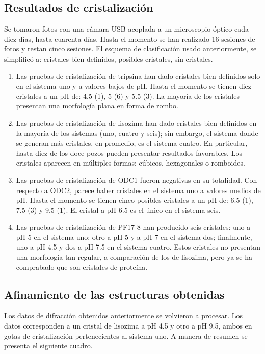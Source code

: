 \documentclass[11pt,letterpaper]{article}
\begin{document}
\subsection{Resultados de cristalización}
Se tomaron fotos con una cámara USB acoplada a un microscopio óptico cada diez días, hasta cuarenta días. Hasta el momento se han realizado 16 sesiones de fotos y restan cinco sesiones. El esquema de clasificación usado anteriormente, se simplificó a: cristales bien definidos, posibles cristales, sin cristales.
\begin{enumerate}
	\item Las pruebas de cristalización de tripsina han dado cristales bien definidos solo en el sistema uno y a valores bajos de pH. Hasta el momento se tienen diez cristales a un pH de: 4.5 (1), 5 (6) y 5.5 (3). La mayoría de los cristales presentan una morfología plana en forma de rombo.
	\item Las pruebas de cristalización de lisozima han dado cristales bien definidos en la mayoría de los sistemas (uno, cuatro y seis); sin embargo, el sistema donde se generan más cristales, en promedio, es el sistema cuatro. En particular, hasta diez de los doce pozos pueden presentar resultados favorables. Los cristales aparecen en múltiples formas; cúbicos, hexagonales o romboides.  
	\item Las pruebas de cristalización de ODC1 fueron negativas en su totalidad. Con respecto a ODC2, parece haber cristales en el sistema uno a valores medios de pH. Hasta el momento se tienen cinco posibles cristales a un pH de: \num{6.5} (\num{1}), \num{7.5} (\num{3}) y \num{9.5} (\num{1}). El cristal a pH 6.5 es el único en el sistema seis.
	\item Las pruebas de cristalización de PF17-8 han producido seis cristales: uno a pH \num{5} en el sistema uno; otro a pH \num{5} y a pH \num{7} en el sistema dos; finalmente, uno a pH \num{4.5} y dos a pH \num{7.5} en el sistema cuatro. Estos cristales no presentan una morfología tan regular, a comparación de los de lisozima, pero ya se ha comprabado que son cristales de proteína.
\end{enumerate}

\subsection{Afinamiento de las estructuras obtenidas}
Los datos de difracción obtenidos anteriormente se volvieron a procesar. Los datos corresponden a un cristal de lisozima a pH \num{4.5} y otro a pH \num{9.5}, ambos en gotas de cristalización pertenecientes al sistema uno. A manera de resumen se presenta el siguiente cuadro.
\end{document}
